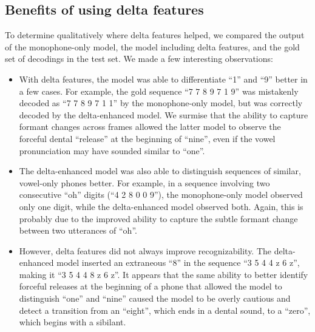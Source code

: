 \documentclass[11pt]{article}
\begin{document}
\subsection{Benefits of using delta features}
To determine qualitatively where delta features helped, we compared the output
of the monophone-only model, the model including delta features, and the gold
set of decodings in the test set. We made a few interesting observations:

\begin{itemize}
  \item With delta features, the model was able to differentiate ``1'' and ``9''
  better in a few cases. For example, the gold sequence ``7 7 8 9 7 1 9'' was
  mistakenly decoded as ``7 7 8 9 7 1 1'' by the monophone-only model, but was
  correctly decoded by the delta-enhanced model. We surmise that the ability to
  capture formant changes across frames allowed the latter model to observe the
  forceful dental ``release'' at the beginning of ``nine'', even if the vowel
  pronunciation may have sounded similar to ``one''.
  \item The delta-enhanced model was also able to distinguish sequences of
  similar, vowel-only phones better. For example, in a sequence involving two
  consecutive ``oh'' digits (``4 2 8 0 0 9''), the monophone-only model observed
  only one digit, while the delta-enhanced model observed both. Again, this is
  probably due to the improved ability to capture the subtle formant change
  between two utterances of ``oh''.
  \item However, delta features did not always improve recognizability. The
  delta-enhanced model inserted an extraneous ``8'' in the sequence ``3 5 4 4 z
  6 z'', making it ``3 5 4 4 8 z 6 z''. It appears that the same ability to
  better identify forceful releases at the beginning of a phone that allowed the
  model to distinguish ``one'' and ``nine'' caused the model to be overly
  cautious and detect a transition from an ``eight'', which ends in a dental
  sound, to a ``zero'', which begins with a sibilant.
\end{itemize}
\end{document}

